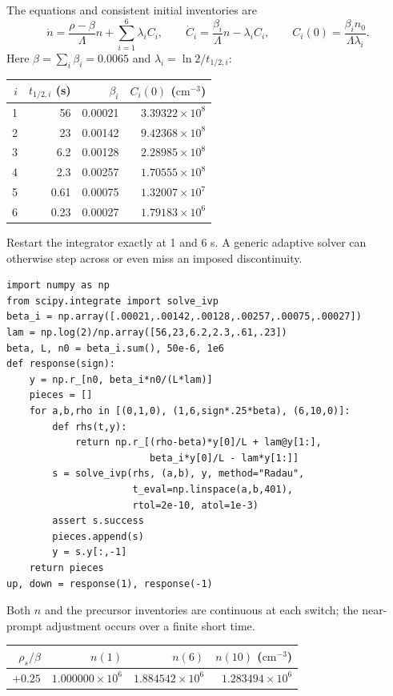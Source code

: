 \begin{adaptedsolution}
The equations and consistent initial inventories are
\[
\dot n=\frac{\rho-\beta}{\Lambda}n+\sum_{i=1}^6\lambda_i C_i,
\qquad \dot C_i=\frac{\beta_i}{\Lambda}n-\lambda_iC_i,
\qquad C_i(0)=\frac{\beta_i n_0}{\Lambda\lambda_i}.
\]
Here $\beta=\sum_i\beta_i=0.0065$ and $\lambda_i=\ln2/t_{1/2,i}$:
\begin{center}\begin{tabular}{rrrr}
\toprule
$i$&$t_{1/2,i}$ (s)&$\beta_i$&$C_i(0)$ ($\mathrm{cm^{-3}}$)\\\midrule
1&56&0.00021&$3.39322\times10^8$\\
2&23&0.00142&$9.42368\times10^8$\\
3&6.2&0.00128&$2.28985\times10^8$\\
4&2.3&0.00257&$1.70555\times10^8$\\
5&0.61&0.00075&$1.32007\times10^7$\\
6&0.23&0.00027&$1.79183\times10^6$\\\bottomrule
\end{tabular}\end{center}
Restart the integrator exactly at 1 and 6 s. A generic adaptive solver can
otherwise step across or even miss an imposed discontinuity.
\begin{verbatim}
import numpy as np
from scipy.integrate import solve_ivp
beta_i = np.array([.00021,.00142,.00128,.00257,.00075,.00027])
lam = np.log(2)/np.array([56,23,6.2,2.3,.61,.23])
beta, L, n0 = beta_i.sum(), 50e-6, 1e6
def response(sign):
    y = np.r_[n0, beta_i*n0/(L*lam)]
    pieces = []
    for a,b,rho in [(0,1,0), (1,6,sign*.25*beta), (6,10,0)]:
        def rhs(t,y):
            return np.r_[(rho-beta)*y[0]/L + lam@y[1:],
                         beta_i*y[0]/L - lam*y[1:]]
        s = solve_ivp(rhs, (a,b), y, method="Radau",
                      t_eval=np.linspace(a,b,401),
                      rtol=2e-10, atol=1e-3)
        assert s.success
        pieces.append(s)
        y = s.y[:,-1]
    return pieces
up, down = response(1), response(-1)
\end{verbatim}
Both $n$ and the precursor inventories are continuous at each switch;
the near-prompt adjustment occurs over a finite short time.
\begin{center}\begin{tabular}{rrrr}
\toprule
$\rho_s/\beta$&$n(1)$&$n(6)$&$n(10)$ ($\mathrm{cm^{-3}}$)\\\midrule
$+0.25$&$1.000000\times10^6$&$1.884542\times10^6$&$1.283494\times10^6$\\

\end{tabular}
\end{center}
\end{adaptedsolution}

